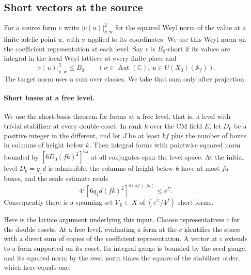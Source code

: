 \subsection{Short vectors at the source}\label{A:source}
For a source form $v$ write $|v(u)|_{\sigma,\mathrm w}^2$ for the squared Weyl norm of the value at a finite adelic point $u$, with $\sigma$ applied to its coordinates. We use this Weyl norm on the coefficient representation at each level. Say $v$ is $B_0$-short if its values are integral in the local Weyl lattices at every finite place and
\[
 |v(u)|_{\sigma,\mathrm w}^2\le B_0\qquad (\sigma\in\operatorname{Aut}(\mathbb C),\ u\in U(X_0)(\mathbb A_f)).
\]
The target norm uses a sum over classes. We take that sum only after projection.

\paragraph{Short bases at a free level.}\label{A:shortbase}
We use the short-basis theorem for forms at a free level, that is, a level with trivial stabilizer at every double coset. In rank $k$ over the CM field $E$, let $D_0$ be a positive integer in the different, and let $J$ be at least $kf$ plus the number of boxes in columns of height below $k$. Then integral forms with pointwise squared norm bounded by $[6D_0(fk)^2]^{6J}$ at all conjugates span the level space. At the initial level $D_0=q_1d$ is admissible, the columns of height below $k$ have at most $fa$ boxes, and the scale estimate reads
\begin{equation}
 4^f[6q_1d(fk)^2]^{6(kf+fa)}\le e^U.
 \label{A:base}
\end{equation}
Consequently there is a spanning set $\mathcal V_0\subset X$ of $(e^U/4^f)$-short forms.

Here is the lattice argument underlying this input. Choose representatives $c$ for the double cosets. At a free level, evaluating a form at the $c$ identifies the space with a direct sum of copies of the coefficient representation. A vector at $c$ extends to a form supported on its coset. Its integral gauge is bounded by the seed gauge, and its squared norm by the seed norm times the square of the stabilizer order, which here equals one.

